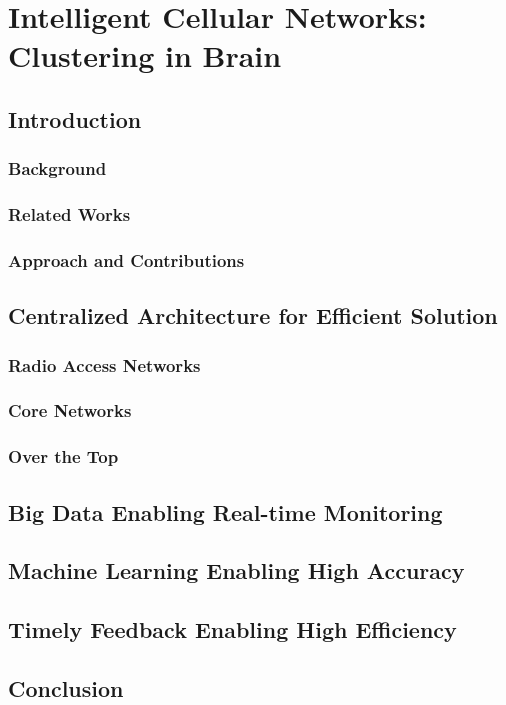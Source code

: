 
\chapter{Intelligent Cellular Networks: Clustering in Brain} %
\minitoc
\label{Chapter6} %

\section{Introduction}
\subsection{Background}
\subsection{Related Works}
\subsection{Approach and Contributions}
\section{Centralized Architecture for Efficient Solution}
\subsection{Radio Access Networks}
\subsection{Core Networks}
\subsection{Over the Top}
\section{Big Data Enabling Real-time Monitoring}
\section{Machine Learning Enabling High Accuracy}
\section{Timely Feedback Enabling High Efficiency}
\section{Conclusion}
